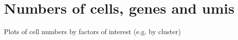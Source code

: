 \section{Numbers of cells, genes and umis}

Plots of cell numbers by factors of interest (e.g. by cluster)



\clearpage

